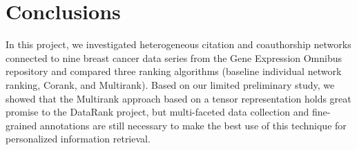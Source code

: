 \section{Conclusions}

In this project, we investigated heterogeneous citation and coauthorship networks connected to nine breast cancer data series from the Gene Expression Omnibus repository and compared three ranking algorithms (baseline individual network ranking, Corank, and Multirank). Based on our limited preliminary study, we showed that the Multirank approach based on a tensor representation holds great promise to the DataRank project, but multi-faceted data collection and fine-grained annotations are still necessary to make the best use of this technique for personalized information retrieval.